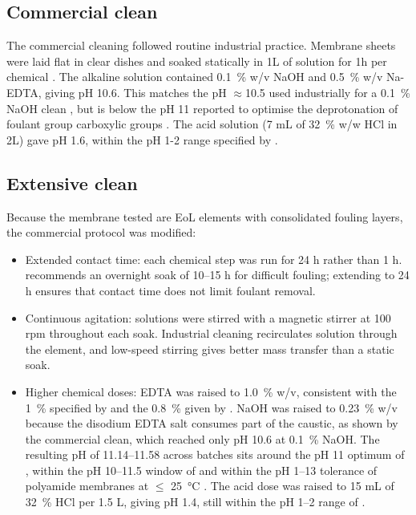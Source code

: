\subsection{Commercial clean}
\label{sec:com-cleaning}
The commercial cleaning followed routine industrial practice. Membrane sheets were laid flat in clear dishes and soaked statically in 1L of solution for 1h per chemical \citep{DuPont2026}. The alkaline solution contained \qty{0.1}{\percent} w/v NaOH and \qty{0.5}{\percent} w/v Na-EDTA, giving pH 10.6. This matches the pH $\approx$10.5 used industrially for a \qty{0.1}{\percent} NaOH clean \citep{zwaneveld2026personal}, but is below the pH 11 reported to optimise the deprotonation of foulant group carboxylic groups \citep{Ang2006}. The acid solution (7 mL of \qty{32}{\percent} w/w HCl in 2L) gave pH 1.6, within the pH 1-2 range specified by \cite{DuPont2026}. 

\subsection{Extensive clean}
\label{sec:ext-cleaning}
Because the membrane tested are EoL elements with consolidated fouling layers, the commercial protocol was modified:
\begin{itemize}
\item Extended contact time: each chemical step was run for 24 h rather than 1 h. \cite{DuPont2026} recommends an overnight soak of 10–15 h for difficult fouling; extending to 24 h ensures that contact time does not limit foulant removal.
\item Continuous agitation: solutions were stirred with a magnetic stirrer at 100 rpm throughout each soak. Industrial cleaning recirculates solution through the element, and low-speed stirring gives better mass transfer than a static soak.
\item Higher chemical doses: EDTA was raised to \qty{1.0}{\percent} w/v, consistent with the \qty{1}{\percent} specified by \cite{DuPont2026} and the \qty{0.8}{\percent} given by \cite{Lenntech2011}. NaOH was raised to \qty{0.23}{\percent} w/v because the disodium EDTA salt consumes part of the caustic, as shown by the commercial clean, which reached only pH 10.6 at \qty{0.1}{\percent} NaOH. The resulting pH of 11.14–11.58 across batches sits around the pH 11 optimum of \cite{Ang2006}, within the pH 10–11.5 window of \cite{Lenntech2011} and within the pH 1–13 tolerance of polyamide membranes at $\le$ \SI{25}{\celsius} \citep{DuPont2026}. The acid dose was raised to 15 mL of \qty{32}{\percent} HCl per 1.5 L, giving pH 1.4, still within the pH 1–2 range of \cite{DuPont2026}.
\end{itemize}


